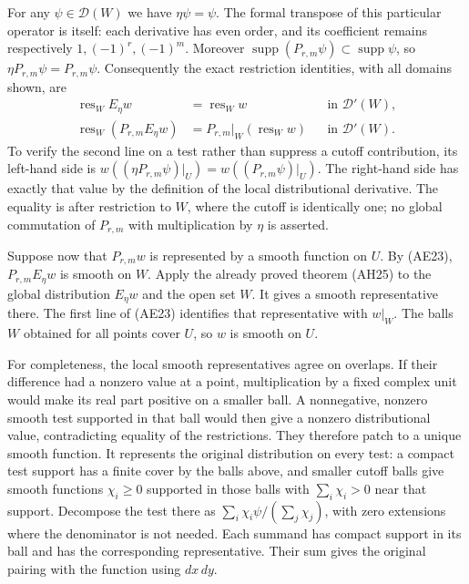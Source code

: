 \documentclass[
  11pt,
]{article}
\begin{document}
For any \(\psi\in\mathcal D(W)\) we have \(\eta\psi=\psi\). The formal
transpose of this particular operator is itself: each derivative has
even order, and its coefficient remains respectively
\(1,(-1)^r,(-1)^m\). Moreover
\(\operatorname{supp}(P_{r,m}\psi)\subset\operatorname{supp}\psi\), so
\(\eta P_{r,m}\psi=P_{r,m}\psi\). Consequently the exact restriction
identities, with all domains shown, are \[
 \begin{aligned}
 \operatorname{res}_W E_\eta w&=\operatorname{res}_W w
          &&\text{in }\mathcal D'(W),\\
 \operatorname{res}_W(P_{r,m}E_\eta w)
      &=P_{r,m}|_W(\operatorname{res}_W w)
          &&\text{in }\mathcal D'(W).
 \end{aligned}
 \tag{AE23}
\] To verify the second line on a test rather than suppress a cutoff
contribution, its left-hand side is
\(w((\eta P_{r,m}\psi)|_U)=w((P_{r,m}\psi)|_U)\). The right-hand side
has exactly that value by the definition of the local distributional
derivative. The equality is after restriction to \(W\), where the cutoff
is identically one; no global commutation of \(P_{r,m}\) with
multiplication by \(\eta\) is asserted.

Suppose now that \(P_{r,m}w\) is represented by a smooth function on
\(U\). By (AE23), \(P_{r,m}E_\eta w\) is smooth on \(W\). Apply the
already proved theorem (AH25) to the global distribution \(E_\eta w\)
and the open set \(W\). It gives a smooth representative there. The
first line of (AE23) identifies that representative with \(w|_W\). The
balls \(W\) obtained for all points cover \(U\), so \(w\) is smooth on
\(U\).

For completeness, the local smooth representatives agree on overlaps. If
their difference had a nonzero value at a point, multiplication by a
fixed complex unit would make its real part positive on a smaller ball.
A nonnegative, nonzero smooth test supported in that ball would then
give a nonzero distributional value, contradicting equality of the
restrictions. They therefore patch to a unique smooth function. It
represents the original distribution on every test: a compact test
support has a finite cover by the balls above, and smaller cutoff balls
give smooth functions \(\chi_i\geq0\) supported in those balls with
\(\sum_i\chi_i>0\) near that support. Decompose the test there as
\(\sum_i\chi_i\psi/(\sum_j\chi_j)\), with zero extensions where the
denominator is not needed. Each summand has compact support in its ball
and has the corresponding representative. Their sum gives the original
pairing with the function using \(dx\,dy\).
\end{document}
